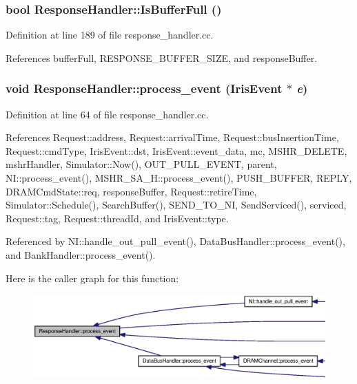 \subsubsection[{IsBufferFull}]{\setlength{\rightskip}{0pt plus 5cm}bool ResponseHandler::IsBufferFull ()}\label{classResponseHandler_79ceeb897565c8fd54f09480f8991047}




Definition at line 189 of file response\_\-handler.cc.

References bufferFull, RESPONSE\_\-BUFFER\_\-SIZE, and responseBuffer.
\subsubsection[{process\_\-event}]{\setlength{\rightskip}{0pt plus 5cm}void ResponseHandler::process\_\-event ({\bf IrisEvent} $\ast$ {\em e})}\label{classResponseHandler_da5e60fb1d62f5ca755dca334bb18f5c}




Definition at line 64 of file response\_\-handler.cc.

References Request::address, Request::arrivalTime, Request::busInsertionTime, Request::cmdType, IrisEvent::dst, IrisEvent::event\_\-data, mc, MSHR\_\-DELETE, mshrHandler, Simulator::Now(), OUT\_\-PULL\_\-EVENT, parent, NI::process\_\-event(), MSHR\_\-SA\_\-H::process\_\-event(), PUSH\_\-BUFFER, REPLY, DRAMCmdState::req, responseBuffer, Request::retireTime, Simulator::Schedule(), SearchBuffer(), SEND\_\-TO\_\-NI, SendServiced(), serviced, Request::tag, Request::threadId, and IrisEvent::type.

Referenced by NI::handle\_\-out\_\-pull\_\-event(), DataBusHandler::process\_\-event(), and BankHandler::process\_\-event().

Here is the caller graph for this function:\nopagebreak
\begin{figure}[H]
\begin{center}
\leavevmode
\includegraphics[width=420pt]{classResponseHandler_da5e60fb1d62f5ca755dca334bb18f5c_icgraph}
\end{center}
\end{figure}
